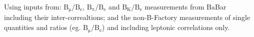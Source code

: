 \noindent Using inputs from: $\mathrm{B_\mu/B_e}$,  $\mathrm{B_\pi/B_e}$ and $\mathrm{B_K/B_e}$ measurements from BaBar including their inter-correaltions; and the non-B-Factory measurements of single quantities and ratios (eg. $\mathrm{B_\mu/B_e}$) and including leptonic correlations only.
